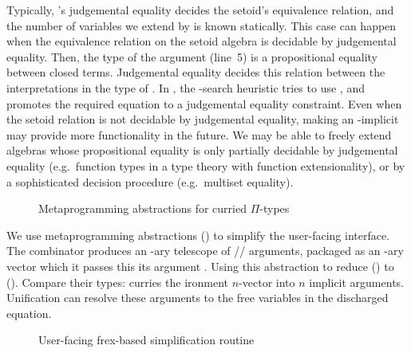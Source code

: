 Typically, \idris{}'s judgemental
equality decides
the  setoid's
equivalence relation, and the number of variables we extend by is known
statically.  This case can happen when the equivalence relation
on the setoid algebra \avar{} is decidable by judgemental
equality. Then, the type of the  argument (line~5) is
a propositional equality between closed terms. Judgemental
equality decides this relation between the interpretations in the
type of .  In \idris{}, the -search
heuristic tries to use , and promotes the required
equation to a judgemental equality constraint.  Even when the setoid relation
is not decidable by judgemental equality,
making  an -implicit may provide
more functionality in the future. We may be able to
freely extend algebras whose propositional equality is only partially
decidable by judgemental equality (e.g.~function types in a
type theory with function extensionality), or by a
sophisticated decision procedure (e.g.~multiset equality).

\begin{figure}
  \begin{minipage}{.75\textwidth}
    \Visibility{}
    \metaPi{}
    \metaPI{}
  \end{minipage}
  \caption{Metaprogramming abstractions for curried $\Pi$-types}
\end{figure}

We use metaprogramming abstractions () to
simplify the user-facing interface. The  combinator
produces an \nvar-ary telescope of
// arguments,
packaged as an \nvar-ary vector which it passes this its argument .
Using this abstraction to reduce
 () to  ().
Compare their types:  curries the ironment
$n$-vector into $n$ implicit arguments.
Unification can resolve these arguments to the free
variables in the discharged equation.

\begin{figure}
  \begin{minipage}{.75\textwidth}
    \solveType[numbers=left]{}
  \end{minipage}
  \caption{User-facing frex-based simplification routine}
\end{figure}

